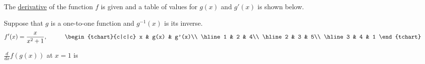 \documentclass{ximera}
\author{Gregory Hartman \and Matthew Carr}
\begin{document}
\begin{exercise}


The \underline{derivative} of the function $f$ is given and a table of values for $g(x)$ and $g'(x)$ is shown below.

Suppose that $g$ is a one-to-one function and $g^{-1}(x)$ is its inverse.
\[
f'(x)=\frac{x}{x^2+1},\hskip 1cm
\begin{tchart}{c|c|c}
x & g(x) & g'(x)\\ \hline
1 & 2 & 4\\ \hline
2 & 3 & 5\\ \hline
3 & 4 & 1
\end{tchart}
\]

$\frac{d}{dx}f(g(x))$ at $x=1$ is
\begin{prompt}
\begin{multipleChoice}
\end{multipleChoice}
\end{prompt}

\end{exercise}
\end{document}

